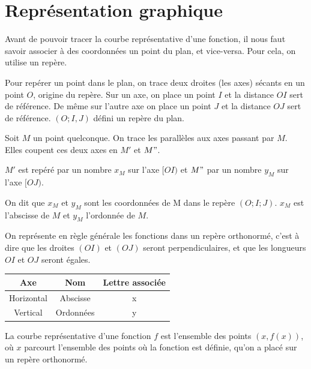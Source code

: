 \documentclass[10pt,a4paper,oneside]{book}
\begin{document}
\section{Représentation graphique}

Avant de pouvoir tracer la courbe représentative d'une fonction, il nous faut savoir associer à des coordonnées un point du plan, et vice-versa. Pour cela, on utilise un repère.

\begin{de}[Repère]
Pour repérer un point dans le plan, on trace deux droites (les axes) sécants en un point $O$, origine du repère. Sur un axe, on place un point $I$ et la distance $OI$ sert de référence. De même sur l'autre axe on place un point $J$ et la distance $OJ$ sert de référence. $(O;I,J)$ défini un repère du plan. 

 Soit $M$ un point quelconque. On trace les parallèles aux axes passant par $M$. Elles coupent ces deux axes en $M'$ et $M"$.

$M'$ est repéré par un nombre $x_{M}$ sur l'axe $[OI)$ et $M"$ par un nombre $y_{M}$ sur l'axe $[OJ)$.

On dit que $x_{M}$ et $y_{M}$ sont les coordonnées de M dans le repère $(O;I;J)$. $x_{M}$ est l’abscisse de $M$ et $y_{M}$ l’ordonnée de $M$.
\end{de}


On représente en règle générale les fonctions dans un repère orthonormé, c'est à dire que les droites $(OI)$ et $(OJ)$ seront perpendiculaires, et que les longueurs $OI$ et $OJ$ seront égales.

\begin{center}
    \begin{tabular}{|c|c|c|}
        \hline
         Axe & Nom & Lettre associée  \\
        \hline
        Horizontal & Abscisse & x \\
        \hline
        Vertical & Ordonnées & y \\
        \hline
    \end{tabular}
\end{center}

\begin{de}
    La courbe représentative d'une fonction $f$ est l'ensemble des points $(x,f(x))$, où $x$ parcourt l'ensemble des points où la fonction est définie, qu'on a placé sur un repère orthonormé.
\end{de}
\end{document}
